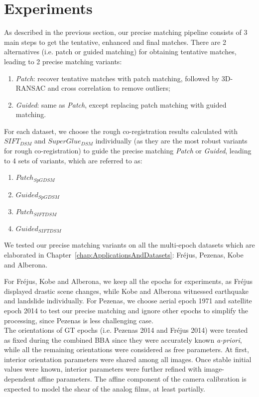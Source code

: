\section{Experiments}
As described in the previous section, our precise matching pipeline consists of 3 main steps to get the tentative, enhanced and final matches. There are 2 alternatives (i.e. patch or guided matching) for obtaining tentative matches, leading to 2 precise matching variants:\\
\begin{enumerate}
	\item \textit{Patch}: recover tentative matches with patch matching, followed by 3D-RANSAC and cross correlation to remove outliers;
	\item \textit{Guided}: same as \textit{Patch}, except replacing patch matching with guided matching.
\end{enumerate}
For each dataset, we choose the rough co-registration results calculated with $SIFT_{DSM}$ and $SuperGlue_{DSM}$ individually (as they are the most robust variants for rough co-registration) to guide the precise matching \textit{Patch} or \textit{Guided}, leading to 4 sets of variants, which are referred to as:\\
\begin{enumerate}
	\item $Patch_{SpGDSM}$
	\item $Guided_{SpGDSM}$
	\item $Patch_{SIFTDSM}$
	\item $Guided_{SIFTDSM}$
\end{enumerate}
We tested our precise matching variants on all the multi-epoch datasets which are elaborated in Chapter~\ref{chap:ApplicationsAndDatasets}: Fr{\'e}jus, Pezenas, Kobe and Alberona.

For Fr{\'e}jus, Kobe and Alberona, we keep all the epochs for experiments, as Fr{\'e}jus displayed drastic scene changes, while Kobe and Alberona witnessed earthquake and landslide individually. For Pezenas, we choose aerial epoch 1971 and satellite epoch 2014 to test our precise matching and ignore other epochs to simplify the processing, since Pezenas is less challenging case.\\

The orientations of \ac{GT} epochs (i.e. Pezenas 2014 and Fr{\'e}jus 2014) were treated as fixed during the combined \ac{BBA} since they were accurately known \textit{a-priori}, while all the remaining orientations were considered as free parameters. At first, {interior orientation parameters} were shared among all images. Once stable initial values were known, interior parameters were further refined with image-dependent affine parameters. The affine component of the camera calibration is expected to model the shear of the analog films, at least partially.\\

